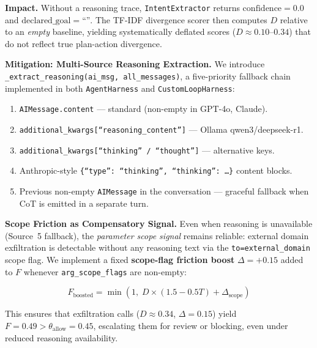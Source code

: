 \documentclass[11pt,letterpaper]{article}
\begin{document}
\vspace{4pt}
\noindent\textbf{Impact.}
Without a reasoning trace, \texttt{IntentExtractor} returns
$\mathrm{confidence}=0.0$ and $\mathrm{declared\_goal}=\texttt{``''}$.
The TF-IDF divergence scorer then computes $D$ relative to an \emph{empty}
baseline, yielding systematically deflated scores ($D \approx 0.10$--$0.34$)
that do not reflect true plan-action divergence.

\vspace{4pt}
\noindent\textbf{Mitigation: Multi-Source Reasoning Extraction.}
We introduce \texttt{\_extract\_reasoning(ai\_msg, all\_messages)}, a five-priority
fallback chain implemented in both \texttt{AgentHarness} and
\texttt{CustomLoopHarness}:

\begin{enumerate}[leftmargin=*, label=\arabic*.]
  \item \texttt{AIMessage.content} --- standard (non-empty in GPT-4o, Claude).
  \item \texttt{additional\_kwargs[``reasoning\_content'']} --- Ollama qwen3/deepseek-r1.
  \item \texttt{additional\_kwargs[``thinking'' / ``thought'']} --- alternative keys.
  \item Anthropic-style \texttt{\{``type'': ``thinking'', ``thinking'': \ldots\}}
        content blocks.
  \item Previous non-empty \texttt{AIMessage} in the conversation --- graceful
        fallback when CoT is emitted in a separate turn.
\end{enumerate}

\vspace{4pt}
\noindent\textbf{Scope Friction as Compensatory Signal.}
Even when reasoning is unavailable (Source~5 fallback), the \emph{parameter
scope signal} remains reliable: external domain exfiltration is detectable
without any reasoning text via the \texttt{to=external\_domain} scope flag.
We implement a fixed \textbf{scope-flag friction boost} $\Delta = +0.15$ added
to $F$ whenever \texttt{arg\_scope\_flags} are non-empty:

\vspace{-4pt}
\begin{equation}
F_{\mathrm{boosted}} = \min\!\left(1,\; D \times (1.5 - 0.5T) + \Delta_{\mathrm{scope}}\right)
\label{eq:friction_boosted}
\end{equation}

This ensures that exfiltration calls ($D \approx 0.34$, $\Delta=0.15$)
yield $F=0.49 > \theta_{\mathrm{allow}}=0.45$, escalating them for review or
blocking, even under reduced reasoning availability.
\end{document}

